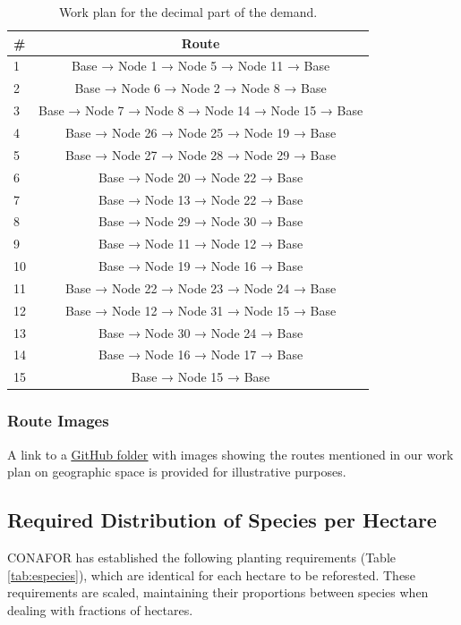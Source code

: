 \documentclass{amsart}
\begin{document}
        
        \begin{table}[!htp]\centering
        \scriptsize
        \begin{tabular}{lc} \toprule
        \textbf{\#} & \textbf{Route} \\\midrule
        1 & Base → Node 1 → Node 5 → Node 11 → Base \\
        2 & Base → Node 6  → Node 2 → Node 8 → Base \\
        3 & Base → Node 7 → Node 8 → Node 14 → Node 15 → Base \\
        4 & Base → Node 26 → Node 25 → Node 19 → Base \\
        5 & Base → Node 27 → Node 28 → Node 29 → Base \\
        6 & Base → Node 20 → Node 22 → Base \\
        7 & Base → Node 13 → Node 22 → Base \\
        8 & Base → Node 29 → Node 30 → Base \\
        9 & Base → Node 11 → Node 12 → Base \\
        10 & Base → Node 19 → Node 16 → Base \\
        11 & Base → Node 22 → Node 23 → Node 24 → Base \\
        12 & Base → Node 12 → Node 31 → Node 15 → Base \\
        13 & Base → Node 30 → Node 24 → Base \\
        14 & Base → Node 16 → Node 17 → Base \\
        15 & Base → Node 15 → Base \\
        \bottomrule
        \end{tabular}
        \vspace{10pt}
        \caption{Work plan for the decimal part of the demand.}\label{tab:ParteDecimal}
    \end{table}
        
            \subsubsection{Route Images}
            A link to a \href{https://github.com/JuanjoBelt/VRP-ReforestationTransportLogistics/tree/5030293089820a896e177f198d9ab7f23ada59e7/Resources/RouteImages}{\underline{GitHub folder}} with images showing the routes mentioned in our work plan on geographic space is provided for illustrative purposes.
        
        \subsection{Required Distribution of Species per Hectare}
        CONAFOR has established the following planting requirements (Table \ref{tab:especies}), which are identical for each hectare to be reforested. These requirements are scaled, maintaining their proportions between species when dealing with fractions of hectares.
        
\end{document}
